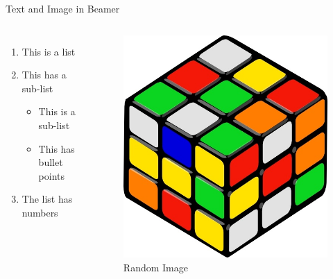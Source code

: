 \begin{frame}{Text and Image in Beamer}
    \begin{columns}
        \begin{enumerate}
            \item This is a list
            \item This has a sub-list
                \begin{itemize}
                    \item This is a sub-list
                    \item This has bullet points
                \end{itemize}
            \item The list has numbers    
        \end{enumerate}
        \begin{figure}
        \centering
        \includegraphics[scale=0.2]{images/illustrate/illus1.jpg}
        \caption{Random Image}
        \end{figure}
    \end{columns}
\end{frame}